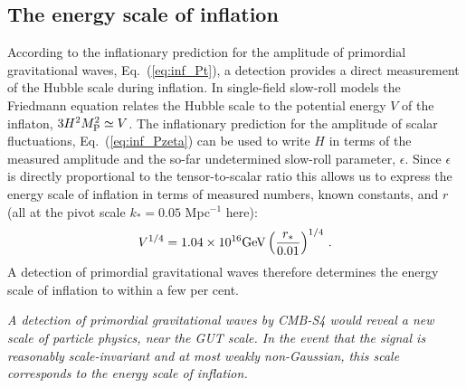\subsection{The energy scale of inflation}
\label{sec:scale-of-inflation}
According to the inflationary prediction for the amplitude of primordial gravitational waves, Eq.~(\ref{eq:inf_Pt}), a detection provides a direct measurement of the Hubble scale during inflation. In single-field slow-roll models the Friedmann equation relates the Hubble scale to the potential energy $V$ of the inflaton, $3H^2M_{\rm P}^2\simeq V$. The inflationary prediction for the amplitude of scalar fluctuations, Eq.~(\ref{eq:inf_Pzeta}) can be used to write $H$ in terms of the measured amplitude and the so-far undetermined slow-roll parameter, $\epsilon$. Since $\epsilon$ is directly proportional to the tensor-to-scalar ratio this allows us to express the energy scale of inflation in terms of measured numbers, known constants, and $r$ (all at the pivot scale $k_\ast=0.05$ Mpc$^{-1}$ here):
\begin{equation}\label{eq:Vofr}
V^{1/4}=1.04\times 10^{16}{\rm GeV}\left(\frac{r_\ast}{0.01}\right)^{1/4}\,.
\end{equation}
A detection of primordial gravitational waves therefore determines the energy scale of inflation to within a few per cent. 

{\it A detection of primordial gravitational waves by CMB-S4 would reveal a new scale of particle physics, near the GUT scale. In the event that the signal is reasonably scale-invariant and at most weakly non-Gaussian, this scale corresponds to the energy scale of inflation.} 


%
